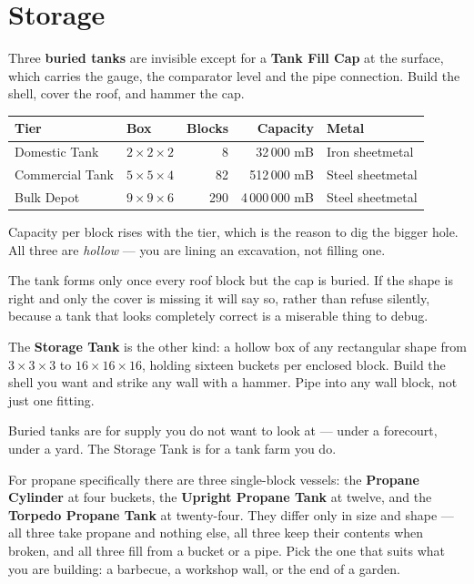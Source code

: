 \section{Storage}

Three \textbf{buried tanks} are invisible except for a \textbf{Tank Fill Cap} at the surface, which
carries the gauge, the comparator level and the pipe connection. Build the shell, cover the roof,
and hammer the cap.

\begin{center}
\small
\begin{tabular}{@{}llrrl@{}}
\toprule
Tier & Box & Blocks & Capacity & Metal \\
\midrule
Domestic Tank   & $2\times2\times2$ & 8   & 32\,000 mB     & Iron sheetmetal \\
Commercial Tank & $5\times5\times4$ & 82  & 512\,000 mB    & Steel sheetmetal \\
Bulk Depot      & $9\times9\times6$ & 290 & 4\,000\,000 mB & Steel sheetmetal \\
\bottomrule
\end{tabular}
\end{center}

Capacity per block rises with the tier, which is the reason to dig the bigger hole. All three are
\emph{hollow} --- you are lining an excavation, not filling one.

\begin{ietip}
The tank forms only once every roof block but the cap is buried. If the shape is right and only
the cover is missing it will say so, rather than refuse silently, because a tank that looks
completely correct is a miserable thing to debug.
\end{ietip}

The \textbf{Storage Tank} is the other kind: a hollow box of any rectangular shape from
$3\times3\times3$ to $16\times16\times16$, holding sixteen buckets per enclosed block. Build the
shell you want and strike any wall with a hammer. Pipe into any wall block, not just one fitting.

\begin{ietip}
Buried tanks are for supply you do not want to look at --- under a forecourt, under a yard. The
Storage Tank is for a tank farm you do.
\end{ietip}

For propane specifically there are three single-block vessels: the \textbf{Propane Cylinder} at four
buckets, the \textbf{Upright Propane Tank} at twelve, and the \textbf{Torpedo Propane Tank} at
twenty-four. They differ only in size and shape --- all three take propane and nothing else, all
three keep their contents when broken, and all three fill from a bucket or a pipe. Pick the one that
suits what you are building: a barbecue, a workshop wall, or the end of a garden.

